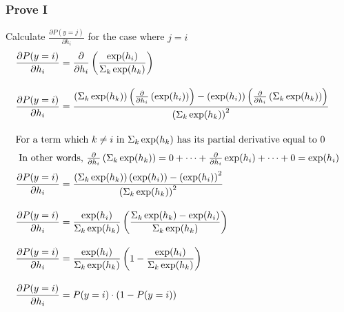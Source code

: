 \documentclass[12pt, a4paper]{article}
\begin{document}
            \subsubsection{Prove I}
                \noindent Calculate $\frac{\partial P(y=j)}{\partial h_i}$ for the case where $j = i$
                \begin{align*}
                    \frac{\partial P(y=i)}{\partial h_i} &= \frac{\partial}{\partial h_i} \left( \frac{\exp(h_i)}{\Sigma_k \exp(h_k)} \right) \\[1em]
                    \frac{\partial P(y=i)}{\partial h_i} &= \frac{
                        \left( \Sigma_k \exp(h_k)  \right) \left( \frac{\partial}{\partial h_i} \left( \exp(h_i) \right) \right)
                        - \left( \exp(h_i)  \right) \left( \frac{\partial}{\partial h_i} \left( \Sigma_k \exp(h_k) \right) \right)
                    }
                    {{\left( \Sigma_k \exp(h_k) \right)}^{2}} \\[1em]
                    \intertext{For a term which $k \neq i$ in $\Sigma_k \exp(h_k)$ has its partial derivative equal to 0}
                    \intertext{
                        In other words, $\frac{\partial}{\partial h_i} \left( \Sigma_k \exp(h_k) \right)
                        = 0 + \dots + \frac{\partial}{\partial h_i} \exp(h_i) + \dots + 0
                        = \exp(h_i)$
                    }
                    \frac{\partial P(y=i)}{\partial h_i} &= \frac{
                        \left( \Sigma_k \exp(h_k)  \right) \left( \exp(h_i) \right)
                        - {\left( \exp(h_i)  \right)}^{2}
                    }
                    {{\left( \Sigma_k \exp(h_k) \right)}^{2}} \\[1em]
                    \frac{\partial P(y=i)}{\partial h_i} &= \frac{\exp(h_i)}{\Sigma_k \exp(h_k)} \left(
                        \frac{\Sigma_k \exp(h_k) - \exp(h_i)}{\Sigma_k \exp(h_k)}
                    \right)\\[1em]
                    \frac{\partial P(y=i)}{\partial h_i} &= \frac{\exp(h_i)}{\Sigma_k \exp(h_k)} \left(
                        1 - \frac{\exp(h_i)}{\Sigma_k \exp(h_k)}
                    \right) \\[1em]
                    \frac{\partial P(y=i)}{\partial h_i} &= P(y=i) \cdot (1 - P(y=i))
                \end{align*}

    \pagebreak
\end{document}
